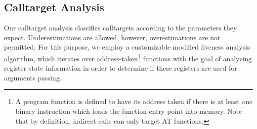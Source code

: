 %
%
%




\subsection{Calltarget Analysis}
\label{section:calltargetanalysis}
Our calltarget analysis classifies calltargets according to the parameters they expect. Underestimations are allowed, however, overestimations 
are not permitted. For this purpose, we employ a customizable modified liveness analysis 
algorithm, which iterates over address-taken\footnote{A program function is defined to have its address taken if there is at least one binary instruction
which loads the function entry point into memory. Note that by definition, indirect calls can only target AT functions.} functions 
with the goal of analyzing register state information in order to determine if these registers are used for arguments passing.

